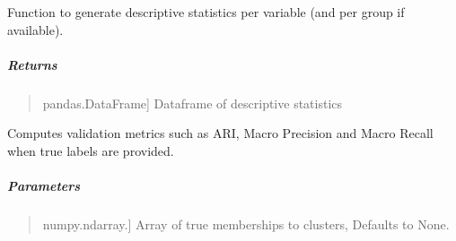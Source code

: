 \documentclass[letterpaper,10pt,english,openany,oneside]{sphinxmanual}
\begin{document}
{{{{\begin{fulllineitems}
\begin{quote}
\begin{description}
\end{description}
\end{quote}

\end{fulllineitems}


\begin{fulllineitems}
\label{\detokenize{api_reference/generated/QuadratiK.spherical_clustering.PKBC:QuadratiK.spherical_clustering.PKBC.stats}}
\pysigstartsignatures
{}
\pysigstopsignatures
\sphinxAtStartPar
Function to generate descriptive statistics per variable (and per group if available).


\subparagraph{Returns}
\label{\detokenize{api_reference/generated/QuadratiK.spherical_clustering.PKBC:id4}}\begin{quote}
\begin{description}
\sphinxlineitem{summary\_stats\_df}{[}pandas.DataFrame{]}
\sphinxAtStartPar
Dataframe of descriptive statistics

\end{description}
\end{quote}

\end{fulllineitems}


\begin{fulllineitems}
\label{\detokenize{api_reference/generated/QuadratiK.spherical_clustering.PKBC:QuadratiK.spherical_clustering.PKBC.validation}}
\pysigstartsignatures
{}
\pysigstopsignatures
\sphinxAtStartPar
Computes validation metrics such as ARI, Macro Precision
and Macro Recall when true labels are provided.


\subparagraph{Parameters}
\label{\detokenize{api_reference/generated/QuadratiK.spherical_clustering.PKBC:id5}}\begin{quote}
\begin{description}
\sphinxlineitem{y\_true}{[}numpy.ndarray.{]}
\sphinxAtStartPar
Array of true memberships to clusters,
Defaults to None.


\end{description}
\end{quote}
\end{fulllineitems}}}}}
\end{document}

